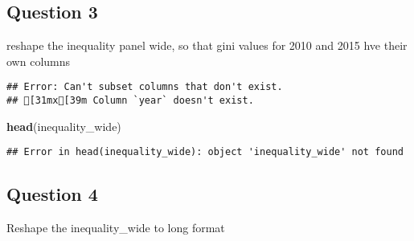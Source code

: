 \documentclass[
]{article}
\newenvironment{Shaded}{\begin{snugshade}}{\end{snugshade}}
\newcommand{\CommentTok}[1]{\textcolor[rgb]{0.56,0.35,0.01}{\textit{#1}}}
\newcommand{\DataTypeTok}[1]{\textcolor[rgb]{0.13,0.29,0.53}{#1}}
\newcommand{\KeywordTok}[1]{\textcolor[rgb]{0.13,0.29,0.53}{\textbf{#1}}}
\newcommand{\NormalTok}[1]{#1}
\newcommand{\OperatorTok}[1]{\textcolor[rgb]{0.81,0.36,0.00}{\textbf{#1}}}
\newcommand{\StringTok}[1]{\textcolor[rgb]{0.31,0.60,0.02}{#1}}
\begin{document}
\hypertarget{question-3}{%
\subsection{Question 3}\label{question-3}}

reshape the inequality panel wide, so that gini values for 2010 and 2015
hve their own columns

\begin{Shaded}
\end{Shaded}

\begin{verbatim}
## Error: Can't subset columns that don't exist.
## [31mx[39m Column `year` doesn't exist.
\end{verbatim}

\begin{Shaded}
\begin{Highlighting}[]
\KeywordTok{head}\NormalTok{(inequality_wide)}
\end{Highlighting}
\end{Shaded}

\begin{verbatim}
## Error in head(inequality_wide): object 'inequality_wide' not found
\end{verbatim}

\hypertarget{question-4}{%
\subsection{Question 4}\label{question-4}}

Reshape the inequality\_wide to long format
\end{document}
